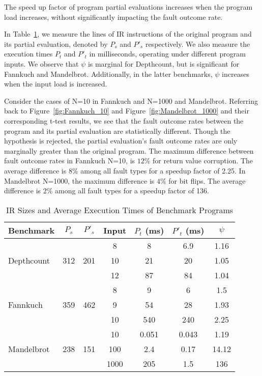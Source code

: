 \begin{obs}
  \label{obs:speedup}
  The speed up factor of program partial evaluations increases when the program load increases, without significantly impacting the fault outcome rate.
\end{obs}

In Table~\ref{tab:benchmarks}, we measure the lines of IR instructions of the original program and its partial evaluation, denoted by $P_s$ and $P'_s$ respectively.
We also measure the execution times $P_t$ and $P'_t$ in milliseconds, operating under different program inputs. 
We observe that $\psi$ is marginal for Depthcount, but is significant for Fannkuch and Mandelbrot.
Additionally, in the latter benchmarks, $\psi$ increases when the input load is increased.

Consider the cases of N=10 in Fannkuch and N=1000 and Mandelbrot.
Referring back to Figure~\ref{fig:Fannkuch_10} and Figure~\ref{fig:Mandelbrot_1000} and their corresponding t-test results, we see that the fault outcome rates between the program and its partial evaluation are statistically different.
Though the hypothesis is rejected, the partial evaluation's fault outcome rates are only marginally greater than the original program.
The maximum difference between fault outcome rates in Fannkuch N=10, is $12\%$ for return value corruption.
The average difference is 8\% among all fault types for a speedup factor of 2.25. 
In Mandelbrot N=1000, the maximum difference is $4\%$ for bit flips.
The average difference is 2\% among all fault types for a speedup factor of 136. 


\begin{table}[htbp]
\small{
\begin{center}
    \begin{tabular}{|p{1.4cm}|c|c|c|c|c|c|}
    \hline
    \textbf{Benchmark} & \textbf{$P_s$} & \textbf{$P'_s$} &  \textbf{Input} & \textbf{$P_t$ (ms)} & \textbf{$P'_t$ (ms)} & $\psi$ \\ \hline
    \multirow{3}{*}{Depthcount}
    & & & 8 & 8 & 6.9 & 1.16\\
	& 312 & 201 & 10 & 21 & 20 & 1.05 \\
 	& & & 12 & 87 & 84 & 1.04 \\ \hline
 	\multirow{3}{*}{Fannkuch}
    & & & 8 & 9 & 6 & 1.5\\
	& 359 & 462 & 9 & 54 & 28 & 1.93 \\
 	& & & 10 & 540 & 240 & 2.25 \\ \hline
 	\multirow{3}{*}{Mandelbrot}
    & & & 10 & 0.051 & 0.043 & 1.19\\
	& 238 & 151 & 100 & 2.4 & 0.17 & 14.12 \\
 	& & & 1000 & 205 & 1.5 & 136 \\ \hline
    \hline
    \end{tabular}
    \end{center}
    }
    \caption{IR Sizes and Average Execution Times of Benchmark Programs}
    \label{tab:benchmarks}
\end{table}


